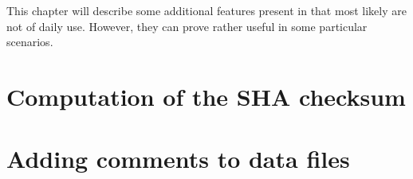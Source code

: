 This chapter will describe some additional features present in \progname that
most likely are not of daily use. However, they can prove rather useful in some
particular scenarios.

\section{Computation of the SHA checksum}

\section{Adding comments to data files}
